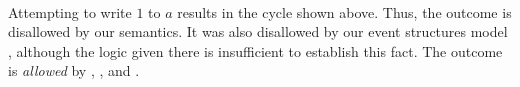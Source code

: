 \begin{example}
\begin{gather*}
\begin{gathered}
  \end{gathered}  
  \end{gather*}
  Attempting to write $1$ to $a$ results in the cycle shown above.  Thus, the
  outcome is disallowed by our semantics.  It was also disallowed by our
  event structures model
  \citep[]{DBLP:journals/lmcs/JeffreyR19}, although the logic
  given there is insufficient to establish this fact.  The outcome is
  \emph{allowed} by 
  \citep{DBLP:conf/esop/JagadeesanPR10}, \citep{DBLP:conf/popl/KangHLVD17},
  and \citep{DBLP:journals/pacmpl/ChakrabortyV19}.


\end{example}
